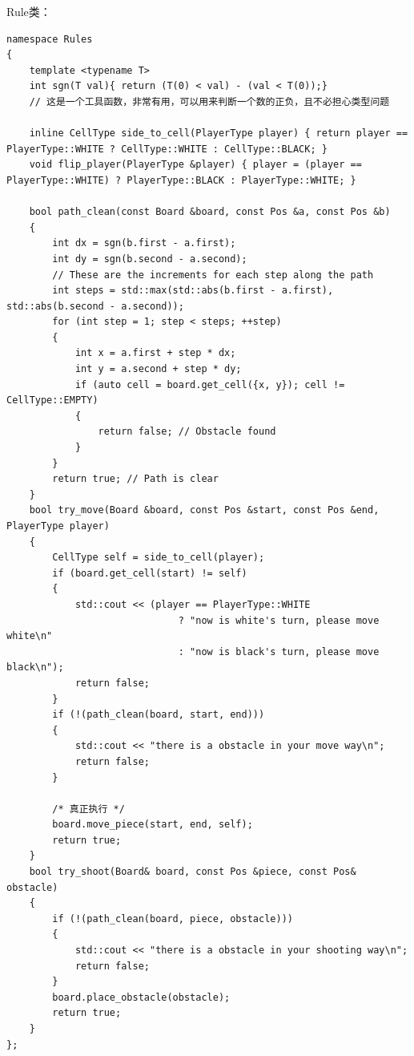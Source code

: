 Rule类：
\begin{verbatim}
namespace Rules
{
    template <typename T>
    int sgn(T val){ return (T(0) < val) - (val < T(0));}
    // 这是一个工具函数，非常有用，可以用来判断一个数的正负，且不必担心类型问题

    inline CellType side_to_cell(PlayerType player) { return player == PlayerType::WHITE ? CellType::WHITE : CellType::BLACK; }
    void flip_player(PlayerType &player) { player = (player == PlayerType::WHITE) ? PlayerType::BLACK : PlayerType::WHITE; }

    bool path_clean(const Board &board, const Pos &a, const Pos &b)
    {
        int dx = sgn(b.first - a.first);
        int dy = sgn(b.second - a.second);
        // These are the increments for each step along the path
        int steps = std::max(std::abs(b.first - a.first), std::abs(b.second - a.second));
        for (int step = 1; step < steps; ++step)
        {
            int x = a.first + step * dx;
            int y = a.second + step * dy;
            if (auto cell = board.get_cell({x, y}); cell != CellType::EMPTY)
            {
                return false; // Obstacle found
            }
        }
        return true; // Path is clear
    }
    bool try_move(Board &board, const Pos &start, const Pos &end, PlayerType player)
    {
        CellType self = side_to_cell(player);
        if (board.get_cell(start) != self)
        {
            std::cout << (player == PlayerType::WHITE
                              ? "now is white's turn, please move white\n"
                              : "now is black's turn, please move black\n");
            return false;
        }
        if (!(path_clean(board, start, end)))
        {
            std::cout << "there is a obstacle in your move way\n";
            return false;
        }

        /* 真正执行 */
        board.move_piece(start, end, self);
        return true;
    }
    bool try_shoot(Board& board, const Pos &piece, const Pos& obstacle)
    {
        if (!(path_clean(board, piece, obstacle)))
        {
            std::cout << "there is a obstacle in your shooting way\n";
            return false;
        }
        board.place_obstacle(obstacle);
        return true;
    }
};
\end{verbatim}

